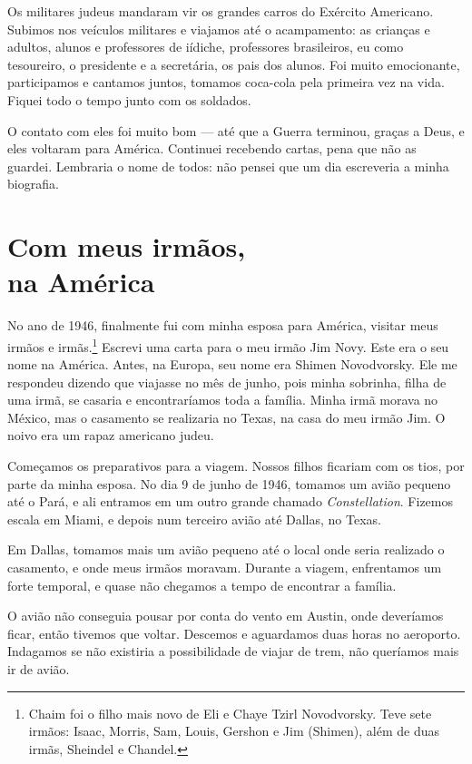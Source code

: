 Os militares judeus mandaram vir os grandes carros do Exército Americano. Subimos nos veículos militares e viajamos até o acampamento: as crianças e adultos, alunos e professores de iídiche, professores brasileiros, eu como tesoureiro, o presidente e a secretária, os pais dos alunos.
Foi muito emocionante, participamos e cantamos juntos, tomamos coca-cola pela primeira vez na
vida. Fiquei todo o tempo junto com os soldados.

O contato com eles foi muito bom --- até que a Guerra terminou, graças a
Deus, e eles voltaram para América. Continuei recebendo cartas, pena
que não as guardei. Lembraria o nome de todos: não pensei que
um dia escreveria a minha biografia.

\chapter*{Com meus irmãos,\\na América}

No ano de 1946, finalmente fui com minha esposa para América, visitar
meus irmãos e irmãs.\footnote{Chaim foi o filho mais novo de Eli e Chaye Tzirl Novodvorsky. Teve sete irmãos: Isaac, Morris, Sam, Louis, Gershon e Jim (Shimen), além de duas irmãs, Sheindel e Chandel.} Escrevi uma carta para o meu irmão Jim Novy. Este
era o seu nome na América. Antes, na Europa, seu nome era Shimen
Novodvorsky. Ele me respondeu dizendo que viajasse no mês de junho,
pois minha sobrinha, filha de uma irmã, se casaria e encontraríamos
toda a família. Minha irmã morava no México, mas o casamento
se realizaria no Texas, na casa do meu irmão Jim. O noivo era um rapaz
americano judeu.

Começamos os preparativos para a viagem. Nossos filhos ficariam com
os tios, por parte da minha esposa. No dia 9 de junho de 1946, tomamos um avião pequeno até o Pará, e ali entramos em um outro grande chamado \textit{Constellation}. Fizemos escala em Miami, e depois num terceiro avião até Dallas, no Texas.

Em Dallas, tomamos mais um avião pequeno até o local onde seria
realizado o casamento, e onde meus irmãos moravam. Durante a viagem,
enfrentamos um forte temporal, e quase não chegamos a tempo de encontrar a
família.

O avião não conseguia pousar por conta do vento em Austin, onde
deveríamos ficar, então tivemos que voltar. Descemos e aguardamos duas
horas no aeroporto. Indagamos se não existiria a possibilidade
de viajar de trem, não queríamos mais ir de avião. 

